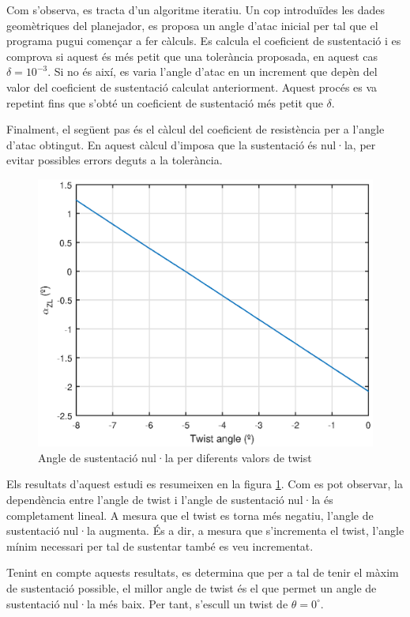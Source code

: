 Com s'observa, es tracta d'un algoritme iteratiu. Un cop introduïdes les dades geomètriques del planejador, es proposa un angle d'atac inicial per tal que el programa pugui començar a fer càlculs. Es calcula el coeficient de sustentació i es comprova si aquest és més petit que una tolerància proposada, en aquest cas $\delta=10^{-3}$. Si no és així, es varia l'angle d'atac en un increment que depèn del valor del coeficient de sustentació calculat anteriorment. Aquest procés es va repetint fins que s'obté un coeficient de sustentació més petit que $\delta$.

Finalment, el següent pas és el càlcul del coeficient de resistència per a l'angle d'atac obtingut. En aquest càlcul d'imposa que la sustentació és nul·la, per evitar possibles errors deguts a la tolerància.

\begin{figure}[h]
	\centering
	\includegraphics{./plots/zlangle}
	\caption{Angle de sustentació nul·la per diferents valors de twist}
	\label{zla}
\end{figure}

Els resultats d'aquest estudi es resumeixen en la figura \ref{zla}. Com es pot observar, la dependència entre l'angle de twist i l'angle de sustentació nul·la és completament lineal. A mesura que el twist es torna més negatiu, l'angle de sustentació nul·la augmenta. És a dir, a mesura que s'incrementa el twist, l'angle mínim necessari per tal de sustentar també es veu incrementat.

Tenint en compte aquests resultats, es determina que per a tal de tenir el màxim de sustentació possible, el millor angle de twist és el que permet un angle de sustentació nul·la més baix. Per tant, s'escull un twist de $\theta=0^{\circ}$.

